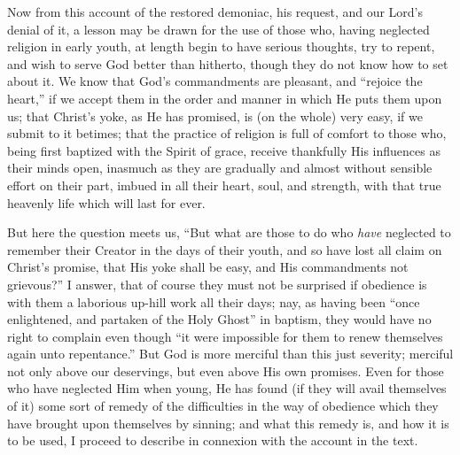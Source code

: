 Now from this account of the restored demoniac, his
request, and our Lord's denial of it, a lesson may be drawn for the use of those who, having neglected religion
in early youth, at length begin to have serious thoughts,
try to repent, and wish to serve God better than
hitherto, though they do not know how to set about it. We
know that God's commandments are pleasant, and
``rejoice the heart,'' if we accept them in the
order and manner in which He puts them upon us; that
Christ's yoke, as He has promised, is (on the whole) very
easy, if we submit to it betimes; that the practice of
religion is full of comfort to those who, being first
baptized with the Spirit of grace, receive thankfully His
influences as their minds open, inasmuch as they are
gradually and almost without sensible effort on their
part, imbued in all their heart, soul, and strength, with
that true heavenly life which will last for ever.

But here the question meets us, ``But what are
those to do who \emph{have} neglected to remember their
Creator in the days of their youth, and so have lost all
claim on Christ's promise, that His yoke shall be easy,
and His commandments not grievous?'' I answer, that
of course they must not be surprised if obedience is with
them a laborious up-hill work all their days; nay, as
having been ``once enlightened, and partaken of the
Holy Ghost'' in baptism, they would have no right to
complain even though ``it were impossible for them to
renew themselves again unto repentance.'' But God is
more merciful than this just severity; merciful not only
above our deservings, but even above His own promises.
Even for those who have neglected Him when young, He has
found (if they will avail themselves of it) some sort of
remedy of the difficulties in the way of obedience which
they have brought upon themselves by sinning; and what
this remedy is, and how it is to be used, I proceed to
describe in connexion with the account in the text.

